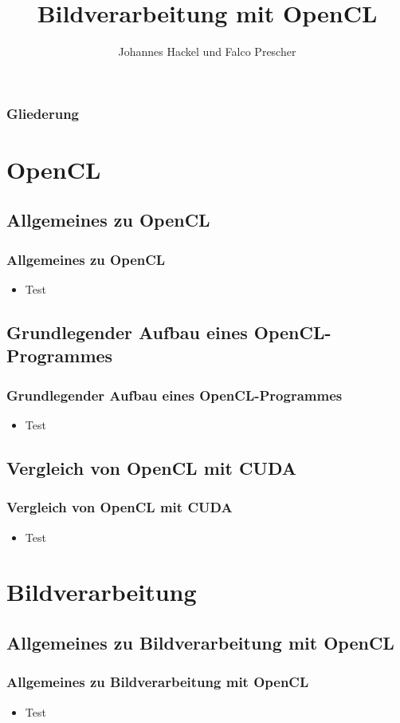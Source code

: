 \documentclass{beamer}
\author{Johannes Hackel und Falco Prescher}
\title{Bildverarbeitung mit OpenCL}
\begin{document}
\begin{frame}
\titlepage
\end{frame}

\begin{frame}
\frametitle{Gliederung}
\tableofcontents
\end{frame}

\section{OpenCL}

\subsection{Allgemeines zu OpenCL}
\begin{frame}
\frametitle{Allgemeines zu OpenCL}
\begin{itemize}
\item Test
\end{itemize}
\end{frame}

\subsection{Grundlegender Aufbau eines OpenCL-Programmes}
\begin{frame}
\frametitle{Grundlegender Aufbau eines OpenCL-Programmes}
\begin{itemize}
\item Test
\end{itemize}
\end{frame}

\subsection{Vergleich von OpenCL mit CUDA}
\begin{frame}
\frametitle{Vergleich von OpenCL mit CUDA}
\begin{itemize}
\item Test
\end{itemize}
\end{frame}

\section{Bildverarbeitung}

\subsection{Allgemeines zu Bildverarbeitung mit OpenCL}
\begin{frame}
\frametitle{Allgemeines zu Bildverarbeitung mit OpenCL}
\begin{itemize}
\item Test
\end{itemize}
\end{frame}
\end{document}
